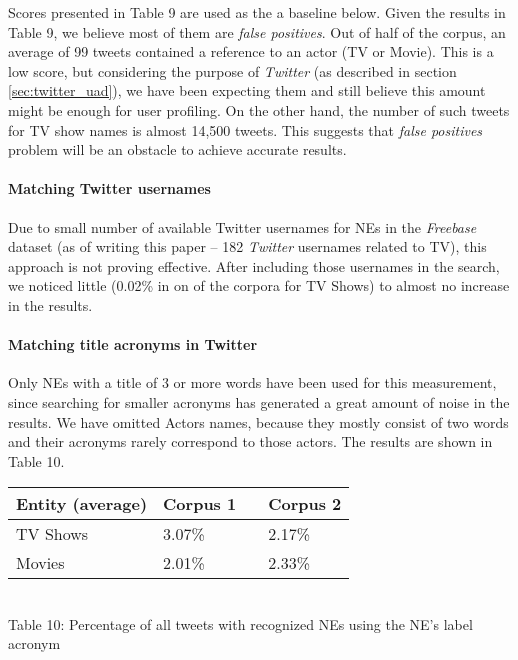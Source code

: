 Scores presented in Table 9 are used as the a baseline below. Given the results in Table 9, we believe
most of them are \textit{false positives}. Out of half of the corpus, an
average of 99 tweets contained a reference to an actor (TV or Movie). This is a low score, but considering the
purpose of \textit{Twitter} (as described in section \ref{sec:twitter_uad}), we have been expecting them and still believe this amount
might be enough for user profiling. On the other hand, the number of such tweets for TV show names is almost 14,500
tweets. This suggests that \textit{false positives} problem will be an obstacle to achieve accurate results.

\paragraph{Matching Twitter usernames}
Due to small number of available Twitter usernames for NEs in the \textit{Freebase} dataset (as of writing this
paper -- 182 \textit{Twitter} usernames related to TV), this approach is not proving effective. After including those
usernames in the search, we noticed little (0.02\% in on of the corpora for TV Shows) to almost no increase in
the results.

\paragraph{Matching title acronyms in Twitter}
Only NEs with a title of 3 or more words have been used for this measurement, since searching
for smaller acronyms has generated a great amount of noise in the results. We have omitted Actors names, because
they mostly consist of two words and their acronyms rarely correspond to those actors. The results
are shown in Table 10.

\begin{center}
  \begin{tabular}{ | p{4cm} | p{2cm} | p{1cm}| p{2cm} | } \hline
    Entity (average) & Corpus 1 & & Corpus 2 \\ \hline
    TV Shows & 3.07\% & & 2.17\% \\ \hline
    Movies & 2.01\% & & 2.33\% \\ \hline
  \end{tabular} \\
  Table 10: Percentage of all tweets with recognized NEs using the NE's label acronym \\
\end{center}

